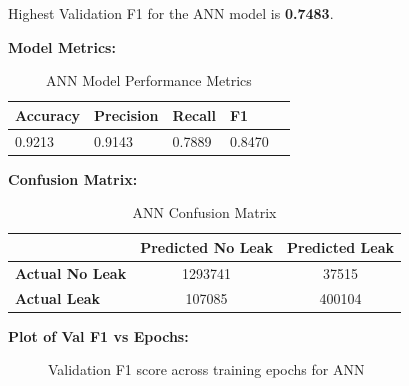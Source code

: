 \documentclass[final,5p,times,twocolumn,authoryear]{elsarticle}
\begin{document}
Highest Validation F1 for the ANN model is \textbf{0.7483}.

\vspace{0.03cm}

\textbf{Model Metrics:}

\begin{table}[H]
\centering
\caption{ANN Model Performance Metrics}
\label{tab:ann_metrics}
\begin{tabular}{@{}lllll@{}}
\toprule
\textbf{Accuracy} & \textbf{Precision} & \textbf{Recall} & \textbf{F1} \\ \midrule
0.9213       & 0.9143         & 0.7889      & 0.8470      \\ \bottomrule
\end{tabular}
\end{table}

\textbf{Confusion Matrix:}

\begin{table}[H]
\centering
\caption{ANN Confusion Matrix}
\label{tab:conf_matrix_ann}
\begin{tabular}{lcc}
\toprule
 & \textbf{Predicted No Leak} & \textbf{Predicted Leak} \\
\midrule
\textbf{Actual No Leak} & 1293741 & 37515 \\
\textbf{Actual  Leak} & 107085 & 400104 \\
\bottomrule
\end{tabular}
\end{table}
   
\textbf{Plot of Val F1 vs Epochs:}

\begin{figure}[H]
\centering
{}
\caption{Validation F1 score across training epochs for ANN}
\label{fig:val_f1_ann}
\end{figure}
\end{document}
